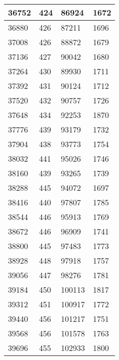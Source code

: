 \begin{longtable}{|l|l|l|l|}
		36752 & 424         & 86924           & 1672             \\ \hline
		36880 & 426         & 87211           & 1696             \\ \hline
		37008 & 426         & 88872           & 1679             \\ \hline
		37136 & 427         & 90042           & 1680             \\ \hline
		37264 & 430         & 89930           & 1711             \\ \hline
		37392 & 431         & 90124           & 1712             \\ \hline
		37520 & 432         & 90757           & 1726             \\ \hline
		37648 & 434         & 92253           & 1870             \\ \hline
		37776 & 439         & 93179           & 1732             \\ \hline
		37904 & 438         & 93773           & 1754             \\ \hline
		38032 & 441         & 95026           & 1746             \\ \hline
		38160 & 439         & 93265           & 1739             \\ \hline
		38288 & 445         & 94072           & 1697             \\ \hline
		38416 & 440         & 97807           & 1785             \\ \hline
		38544 & 446         & 95913           & 1769             \\ \hline
		38672 & 446         & 96909           & 1741             \\ \hline
		38800 & 445         & 97483           & 1773             \\ \hline
		38928 & 448         & 97918           & 1757             \\ \hline
		39056 & 447         & 98276           & 1781             \\ \hline
		39184 & 450         & 100113          & 1817             \\ \hline
		39312 & 451         & 100917          & 1772             \\ \hline
		39440 & 456         & 101217          & 1751             \\ \hline
		39568 & 456         & 101578          & 1763             \\ \hline
		39696 & 455         & 102933          & 1800             \\ \hline

\end{longtable}
